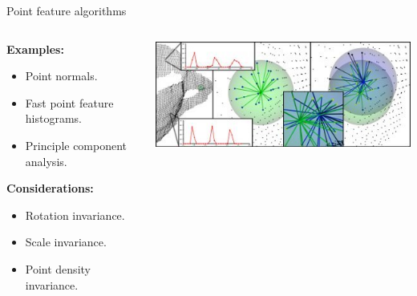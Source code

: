 \documentclass{beamer}
\begin{document}
\begin{frame}{Point feature algorithms}

\begin{columns}[T]
\begin{column}{0.5\textwidth}

\textbf{Examples:}
\begin{itemize}
\item Point normals.
\item Fast point feature histograms.
\item Principle component analysis.
\end{itemize}

\textbf{Considerations:}
\begin{itemize}
\item Rotation invariance.
\item Scale invariance.
\item Point density invariance.
\end{itemize}

\end{column}

\begin{column}{0.5\textwidth}

\includegraphics[width=1\textwidth]{pics/features.png}

\end{column}

\end{columns}

\end{frame}
\end{document}
